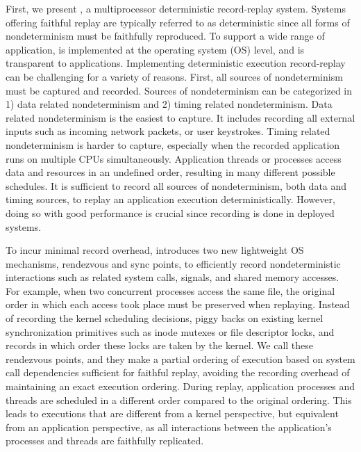 First, we present \scribe, a multiprocessor deterministic record-replay system.
Systems offering faithful replay are typically referred to as deterministic
since all forms of nondeterminism must be faithfully reproduced.
To support a wide range of application, \scribe is
implemented at the operating system (OS) level, and is transparent to applications.
Implementing deterministic execution record-replay can be challenging for a
variety of reasons. First, all sources of nondeterminism must be captured and
recorded.  Sources of nondeterminism can be categorized in 1) data related
nondeterminism and 2) timing related nondeterminism. Data related nondeterminism
is the easiest to capture. It includes recording all external inputs such as
incoming network packets, or user keystrokes. Timing related nondeterminism is
harder to capture, especially when the recorded application runs on multiple
CPUs simultaneously.  Application threads or processes access data and resources
in an undefined order, resulting in many different possible schedules. It is
sufficient to record all sources of nondeterminism, both data and timing
sources, to replay an application execution deterministically.  However, doing
so with good performance is crucial since recording is done in deployed systems.

To incur minimal record overhead, \scribe introduces two new lightweight OS
mechanisms, rendezvous and sync points, to efficiently record nondeterministic
interactions such as related system calls, signals, and shared memory accesses.
For example, when two concurrent processes access the same file, the original
order in which each access took place must be preserved when replaying.  Instead
of recording the kernel scheduling decisions, \scribe piggy backs on existing
kernel synchronization primitives such as inode mutexes or file descriptor
locks, and records in which order these locks are taken by the kernel.  We call
these rendezvous points, and they make a partial ordering of execution based on
system call dependencies sufficient for faithful replay, avoiding the recording overhead
of maintaining an exact execution ordering.
During replay, application processes and threads are scheduled in a
different order compared to the original ordering. This leads to executions that are
different from a kernel perspective, but equivalent from an application perspective,
as all interactions between the application's processes and threads
are faithfully replicated.

